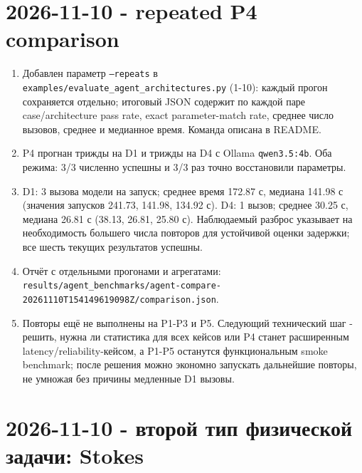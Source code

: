 \documentclass[11pt,a4paper]{article}
\begin{document}
\section{2026-11-10 - repeated P4 comparison}

\begin{enumerate}
    \item Добавлен параметр \texttt{--repeats} в \texttt{examples/evaluate\_agent\_architectures.py} (1-10): каждый прогон сохраняется отдельно; итоговый JSON содержит по каждой паре case/architecture pass rate, exact parameter-match rate, среднее число вызовов, среднее и медианное время. Команда описана в README.
    \item P4 прогнан трижды на D1 и трижды на D4 с Ollama \texttt{qwen3.5:4b}. Оба режима: 3/3 численно успешны и 3/3 раз точно восстановили параметры.
    \item D1: 3 вызова модели на запуск; среднее время 172.87 с, медиана 141.98 с (значения запусков 241.73, 141.98, 134.92 с). D4: 1 вызов; среднее 30.25 с, медиана 26.81 с (38.13, 26.81, 25.80 с). Наблюдаемый разброс указывает на необходимость большего числа повторов для устойчивой оценки задержки; все шесть текущих результатов успешны.
    \item Отчёт с отдельными прогонами и агрегатами: \texttt{results/agent\_benchmarks/agent-compare-20261110T154149619098Z/comparison.json}.
    \item Повторы ещё не выполнены на P1-P3 и P5. Следующий технический шаг - решить, нужна ли статистика для всех кейсов или P4 станет расширенным latency/reliability-кейсом, а P1-P5 останутся функциональным smoke benchmark; после решения можно экономно запускать дальнейшие повторы, не умножая без причины медленные D1 вызовы.
\end{enumerate}

\section{2026-11-10 - второй тип физической задачи: Stokes}
\end{document}
